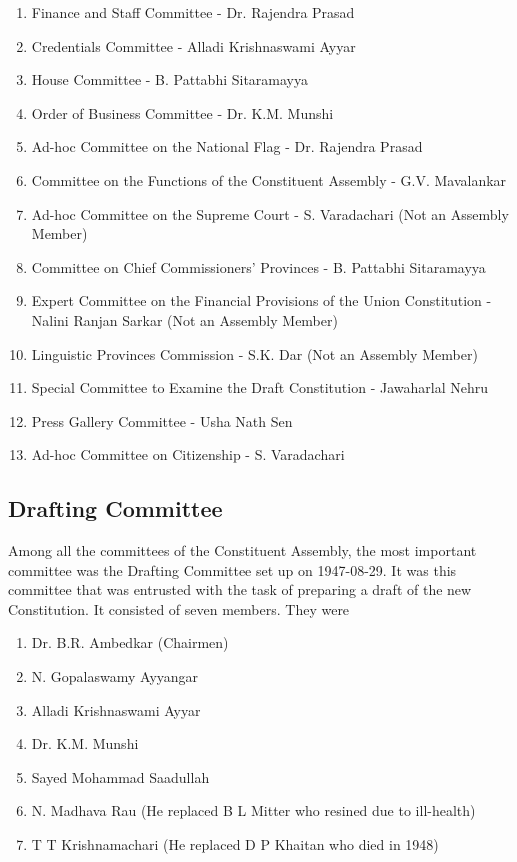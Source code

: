 \begin{multicol}{2}
\begin{enumerate}
  \item Finance and Staff Committee - Dr. Rajendra Prasad
  \item Credentials Committee - Alladi Krishnaswami Ayyar
  \item House Committee - B. Pattabhi Sitaramayya
  \item Order of Business Committee - Dr. K.M. Munshi
  \item Ad-hoc Committee on the National Flag - Dr. Rajendra Prasad
  \item Committee on the Functions of the Constituent Assembly - G.V. Mavalankar
  \item Ad-hoc Committee on the Supreme Court - S. Varadachari (Not an Assembly Member)
  \item Committee on Chief Commissioners’ Provinces - B. Pattabhi Sitaramayya
  \item Expert Committee on the Financial Provisions of the Union Constitution - Nalini Ranjan Sarkar (Not an Assembly Member)
  \item Linguistic Provinces Commission - S.K. Dar (Not an Assembly Member)
  \item Special Committee to Examine the Draft Constitution - Jawaharlal Nehru
  \item Press Gallery Committee - Usha Nath Sen
  \item Ad-hoc Committee on Citizenship - S. Varadachari
\end{enumerate}


\subsection{Drafting Committee}

Among all the committees of the Constituent Assembly, the most important committee was the Drafting Committee set up on 1947-08-29. It was this committee that was entrusted with the task of preparing a draft of the new Constitution. It consisted of seven members. They were

\begin{enumerate}
  \item Dr. B.R. Ambedkar ({ Chairmen})
  \item N. Gopalaswamy Ayyangar
  \item Alladi Krishnaswami Ayyar
  \item Dr. K.M. Munshi
  \item Sayed Mohammad Saadullah
  \item N. Madhava Rau (He replaced B L Mitter who resined due to ill-health)
  \item T T Krishnamachari (He replaced D P Khaitan who died in 1948)
\end{enumerate}


\end{multicol}
